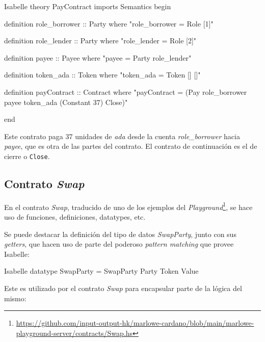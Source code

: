 \documentclass[12pt]{book}
\begin{document}
\begin{code}[title=Contrato \textit{Pay}]{Isabelle}
theory PayContract
  imports Semantics
begin

definition role_borrower :: Party where
"role_borrower = Role [1]"

definition role_lender :: Party where
"role_lender = Role [2]"

definition payee :: Payee where
"payee = Party role_lender"

definition token_ada :: Token where
"token_ada = Token [] []"

definition payContract :: Contract where
"payContract = (Pay role_borrower payee token_ada (Constant 37) Close)"

end
\end{code}

Este contrato paga 37 unidades de \textit{ada} desde la cuenta \textit{role\_borrower} hacia \textit{payee}, que es otra de las partes del contrato. El contrato de continuación es el de cierre o \texttt{Close}.

\subsection{Contrato \textit{Swap}}

En el contrato \textit{Swap}, traducido de uno de los ejemplos del \textit{Playground}\footnote{\url{https://github.com/input-output-hk/marlowe-cardano/blob/main/marlowe-playground-server/contracts/Swap.hs}}, se hace uso de funciones, definiciones, datatypes, etc. 

Se puede destacar la definición del tipo de datos \textit{SwapParty}, junto con sus \textit{getters}, que hacen uso de parte del poderoso \textit{pattern matching} que provee Isabelle:

\begin{code}[title=Definición del tipo de dato \textit{SwapParty}.]{Isabelle}
datatype SwapParty = SwapParty Party Token Value
\end{code}

Este es utilizado por el contrato \textit{Swap} para encapsular parte de la lógica del mismo:
\end{document}
